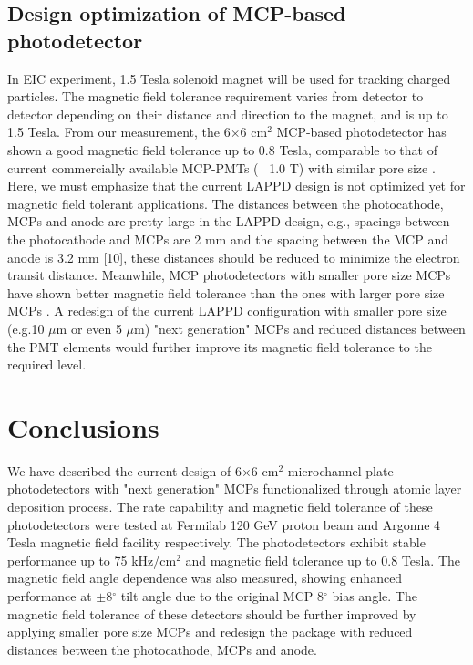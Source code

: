 \documentclass[preprint,5p]{elsarticle}
\begin{document}
\subsection{Design optimization of MCP-based photodetector}\label{subsec_opt}
In EIC experiment, 1.5 Tesla solenoid magnet will be used for tracking charged particles. The magnetic field tolerance requirement varies from detector to detector depending on their distance and direction to the magnet, and is up to 1.5 Tesla. From our measurement, the 6$\times$6 cm$^2$ MCP-based photodetector has shown a good magnetic field tolerance up to 0.8 Tesla, comparable to that of current commercially available MCP-PMTs (~ 1.0 T) with similar pore size \cite{MCPs-B}. Here, we must emphasize that the current LAPPD design is not optimized yet for magnetic field tolerant applications. The distances between the photocathode, MCPs and anode are pretty large in the LAPPD design, e.g., spacings between the photocathode and MCPs are 2 mm and the spacing between the MCP and anode is 3.2 mm [10], these distances should be reduced to minimize the electron transit distance. Meanwhile, MCP photodetectors with smaller pore size MCPs have shown better magnetic field tolerance than the ones with larger pore size MCPs \cite{MCPs-B, Lehmann, Ilieva}. A redesign of the current LAPPD configuration with smaller pore size (e.g.10 $\mu$m or even 5 $\mu$m) "next generation" MCPs and reduced distances between the PMT elements would further improve its magnetic field tolerance to the required level. 

\section{Conclusions}
We have described the current design of 6$\times$6 cm$^2$ microchannel plate photodetectors with "next generation" MCPs functionalized through atomic layer deposition process. The rate capability and magnetic field tolerance of these photodetectors were tested at Fermilab 120 GeV proton beam and Argonne 4 Tesla magnetic field facility respectively. The photodetectors exhibit stable performance up to 75 kHz/cm$^2$ and magnetic field tolerance up to 0.8 Tesla. The magnetic field angle dependence was also measured, showing enhanced performance at $\pm$8$^{\circ}$ tilt angle due to the original MCP 8$^{\circ}$ bias angle. The magnetic field tolerance of these detectors should be further improved by applying smaller pore size MCPs and redesign the package with reduced distances between the photocathode, MCPs and anode.
 
\end{document}
